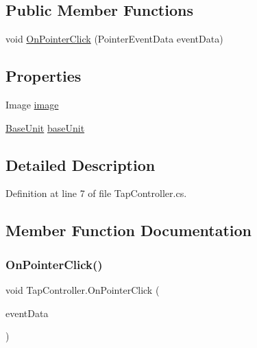 \subsection*{Public Member Functions}
\begin{DoxyCompactItemize}
\item 
void \mbox{\hyperlink{class_tap_controller_ac66ecd378ed27b1ded7402b758204bec}{On\+Pointer\+Click}} (Pointer\+Event\+Data event\+Data)
\end{DoxyCompactItemize}
\subsection*{Properties}
\begin{DoxyCompactItemize}
\item 
Image \mbox{\hyperlink{class_tap_controller_a0da9433117902759e995719f5ef952aa}{image}}
\item 
\mbox{\hyperlink{class_base_unit}{Base\+Unit}} \mbox{\hyperlink{class_tap_controller_ade0ce865eb39ef6a86a8015e5bb90a55}{base\+Unit}}
\end{DoxyCompactItemize}


\subsection{Detailed Description}


Definition at line 7 of file Tap\+Controller.\+cs.



\subsection{Member Function Documentation}
\mbox{\label{class_tap_controller_ac66ecd378ed27b1ded7402b758204bec}} 
\subsubsection{\texorpdfstring{OnPointerClick()}{OnPointerClick()}}
{\footnotesize\ttfamily void Tap\+Controller.\+On\+Pointer\+Click (\begin{DoxyParamCaption}\item[{Pointer\+Event\+Data}]{event\+Data }\end{DoxyParamCaption})}



